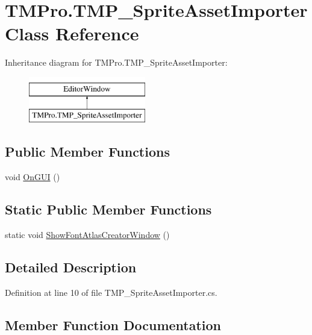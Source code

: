 \hypertarget{class_t_m_pro_1_1_t_m_p___sprite_asset_importer}{}\section{T\+M\+Pro.\+T\+M\+P\+\_\+\+Sprite\+Asset\+Importer Class Reference}
\label{class_t_m_pro_1_1_t_m_p___sprite_asset_importer}
Inheritance diagram for T\+M\+Pro.\+T\+M\+P\+\_\+\+Sprite\+Asset\+Importer\+:\begin{figure}[H]
\begin{center}
\leavevmode
\includegraphics[height=2.000000cm]{class_t_m_pro_1_1_t_m_p___sprite_asset_importer}
\end{center}
\end{figure}
\subsection*{Public Member Functions}
\begin{DoxyCompactItemize}
\item 
void \mbox{\hyperlink{class_t_m_pro_1_1_t_m_p___sprite_asset_importer_a5a2c0ed3a6a4fbea87bd74188fa967ef}{On\+G\+UI}} ()
\end{DoxyCompactItemize}
\subsection*{Static Public Member Functions}
\begin{DoxyCompactItemize}
\item 
static void \mbox{\hyperlink{class_t_m_pro_1_1_t_m_p___sprite_asset_importer_a3df4961b68f84eaa434f9204c4919963}{Show\+Font\+Atlas\+Creator\+Window}} ()
\end{DoxyCompactItemize}


\subsection{Detailed Description}


Definition at line 10 of file T\+M\+P\+\_\+\+Sprite\+Asset\+Importer.\+cs.



\subsection{Member Function Documentation}
\mbox{\label{class_t_m_pro_1_1_t_m_p___sprite_asset_importer_a5a2c0ed3a6a4fbea87bd74188fa967ef}} 
